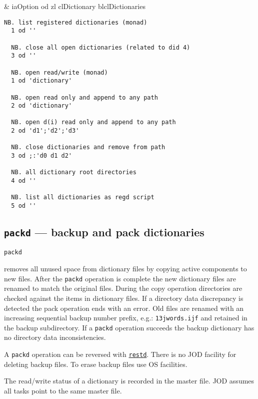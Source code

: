 \begin{wordhead}
\dyad & iaOption od zl \argsep clDictionary \argsep blclDictionaries \\
\end{wordhead}
\begin{lstlisting}[frame=single,framerule=0pt] 
  NB. list registered dictionaries (monad)
  1 od '' 
  
  NB. close all open dictionaries (related to did 4) 
  3 od '' 

  NB. open read/write (monad)
  1 od 'dictionary' 
  
  NB. open read only and append to any path 
  2 od 'dictionary'   

  NB. open d(i) read only and append to any path
  2 od 'd1';'d2';'d3' 
  
  NB. close dictionaries and remove from path
  3 od ;:'d0 d1 d2'  
  
  NB. all dictionary root directories
  4 od ''  
              
  NB. list all dictionaries as regd script
  5 od ''             
\end{lstlisting}


\subsection{\texttt{packd} --- backup and pack dictionaries}\label{ss:packd}

\hypertarget{il:packd}{\texttt{packd}} removes all unused space 
from dictionary files by copying active components to new files.
 After the \texttt{packd} operation is complete the new dictionary files 
 are renamed to match the original files. During the copy operation directories 
 are checked against the items in dictionary files. If 
 a directory data discrepancy is detected
 the pack operation ends with an error. Old files are renamed 
 with an increasing sequential backup number prefix, e.g.: \verb|13jwords.ijf| and 
 retained in the backup subdirectory. If a \texttt{packd} operation succeeds 
 the backup dictionary has no directory data inconsistencies. 

A \texttt{packd} operation can be reversed with \hyperlink{il:restd}{\texttt{restd}}. There is 
no JOD facility for deleting  backup files. To erase backup files use OS facilities. 

The read/write status of a dictionary is recorded in 
the master file. JOD assumes all tasks point to the same master file. 


